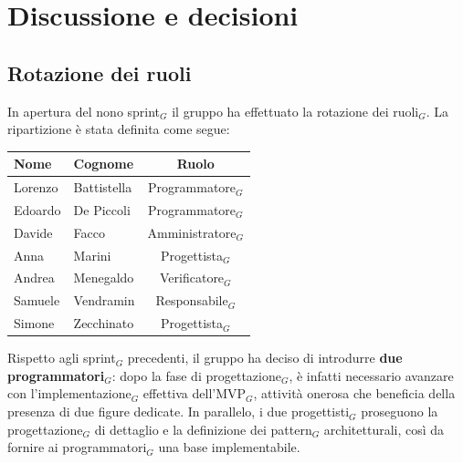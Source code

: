 \documentclass[a4paper, 10pt, colorlinks=true, linkcolor=black, urlcolor=blue, citecolor=blue, hidelinks]{article}
\begin{document}
\section{Discussione e decisioni}

\subsection{Rotazione dei ruoli}
In apertura del nono sprint$_G$ il gruppo ha effettuato la rotazione dei ruoli$_G$. La ripartizione è stata definita come segue:
\begin{center}
    \begin{tabular}{|l|l|c|}
        \hline
        \textbf{Nome} & \textbf{Cognome} & \textbf{Ruolo} \\
        \hline
        Lorenzo & Battistella & Programmatore$_G$ \\
        \hline
        Edoardo & De Piccoli & Programmatore$_G$ \\
        \hline
        Davide & Facco & Amministratore$_G$ \\
        \hline
        Anna & Marini & Progettista$_G$ \\
        \hline
        Andrea & Menegaldo & Verificatore$_G$ \\
        \hline
        Samuele & Vendramin & Responsabile$_G$ \\
        \hline
        Simone & Zecchinato & Progettista$_G$ \\
        \hline
    \end{tabular}
\end{center}

Rispetto agli sprint$_G$ precedenti, il gruppo ha deciso di introdurre \textbf{due programmatori$_G$}: dopo la fase di progettazione$_G$, è infatti necessario avanzare con l'implementazione$_G$ effettiva dell'MVP$_G$, attività onerosa che beneficia della presenza di due figure dedicate. In parallelo, i due progettisti$_G$ proseguono la progettazione$_G$ di dettaglio e la definizione dei pattern$_G$ architetturali, così da fornire ai programmatori$_G$ una base implementabile.
\end{document}
